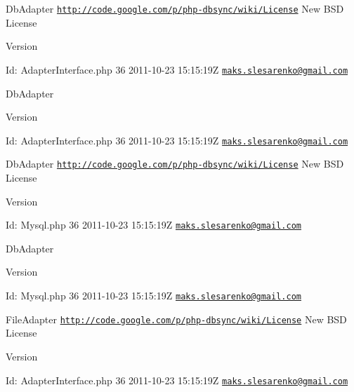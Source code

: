 DbAdapter  \href{http://code.google.com/p/php-dbsync/wiki/License}{\tt http://code.google.com/p/php-\/dbsync/wiki/License} New BSD License \begin{DoxyVersion}{Version}

\end{DoxyVersion}
\begin{DoxyParagraph}{Id:}
AdapterInterface.php 36 2011-\/10-\/23 15:15:19Z \href{mailto:maks.slesarenko@gmail.com}{\tt maks.slesarenko@gmail.com} 
\end{DoxyParagraph}


DbAdapter \begin{DoxyVersion}{Version}

\end{DoxyVersion}
\begin{DoxyParagraph}{Id:}
AdapterInterface.php 36 2011-\/10-\/23 15:15:19Z \href{mailto:maks.slesarenko@gmail.com}{\tt maks.slesarenko@gmail.com} 
\end{DoxyParagraph}


DbAdapter  \href{http://code.google.com/p/php-dbsync/wiki/License}{\tt http://code.google.com/p/php-\/dbsync/wiki/License} New BSD License \begin{DoxyVersion}{Version}

\end{DoxyVersion}
\begin{DoxyParagraph}{Id:}
Mysql.php 36 2011-\/10-\/23 15:15:19Z \href{mailto:maks.slesarenko@gmail.com}{\tt maks.slesarenko@gmail.com} 
\end{DoxyParagraph}


DbAdapter \begin{DoxyVersion}{Version}

\end{DoxyVersion}
\begin{DoxyParagraph}{Id:}
Mysql.php 36 2011-\/10-\/23 15:15:19Z \href{mailto:maks.slesarenko@gmail.com}{\tt maks.slesarenko@gmail.com} 
\end{DoxyParagraph}


FileAdapter  \href{http://code.google.com/p/php-dbsync/wiki/License}{\tt http://code.google.com/p/php-\/dbsync/wiki/License} New BSD License \begin{DoxyVersion}{Version}

\end{DoxyVersion}
\begin{DoxyParagraph}{Id:}
AdapterInterface.php 36 2011-\/10-\/23 15:15:19Z \href{mailto:maks.slesarenko@gmail.com}{\tt maks.slesarenko@gmail.com} 
\end{DoxyParagraph}


